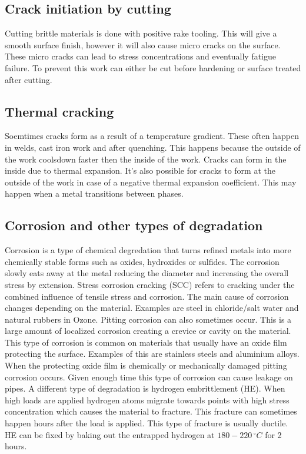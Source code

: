 \documentclass[11pt, a4paper]{article}
\begin{document}
\subsection{Crack initiation by cutting}
Cutting brittle materials is done with positive rake tooling. This will give a smooth surface finish, however it will also cause micro cracks on the surface. These micro cracks can lead to stress concentrations and eventually fatigue failure. To prevent this work can either be cut before hardening or surface treated after cutting.


\subsection{Thermal cracking}
Soemtimes cracks form as a result of a temperature gradient. These often happen in welds, cast iron work and after quenching. This happens because the outside of the work coolsdown faster then the inside of the work. Cracks can form in the inside due to thermal expansion. It's also possible for cracks to form at the outside of the work in case of a negative thermal expansion coefficient. This may happen when a metal transitions between phases.


\subsection{Corrosion and other types of degradation}
Corrosion is a type of chemical degredation that turns refined metals into more chemically stable forms such as oxides, hydroxides or sulfides. The corrosion slowly eats away at the metal reducing the diameter and increasing the overall stress by extension. Stress corrosion cracking (SCC) refers to cracking under the combined influence of tensile stress and corrosion. The main cause of corrosion changes depending on the material. Examples are steel in chloride/salt water and natural rubbers in Ozone. Pitting corrosion can also sometimes occur. This is a large amount of localized corrosion creating a crevice or cavity on the material. This type of corrosion is common on materials that usually have an oxide film protecting the surface. Examples of this are stainless steels and aluminium alloys. When the protecting oxide film is chemically or mechanically damaged pitting corrosion occurs. Given enough time this type of corrosion can cause leakage on pipes.
A different type of degradation is hydrogen embrittlement (HE). When high loads are applied hydrogen atoms migrate towards points with high stress concentration which causes the material to fracture. This fracture can sometimes happen hours after the load is applied. This type of fracture is usually ductile. HE can be fixed by baking out the entrapped hydrogen at $180-220\,^\circ C$ for 2 hours.
\end{document}
